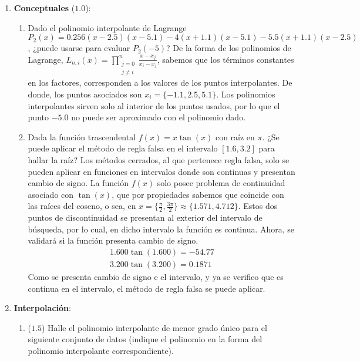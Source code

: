 \documentclass[12pt]{article}
\begin{document}
  \begin{enumerate}[leftmargin=*,widest=9]
    \item \textbf{Conceptuales} ($1.0$):
    \begin{enumerate}[label=\alph*]
    \item Dado el polinomio interpolante de Lagrange \(P_2(x) = 0.256(x-2.5)(x-5.1) - 4(x+1.1)(x-5.1) - 5.5(x+1.1)(x-2.5) \), ¿puede usarse para evaluar \(P_2(-5)\)?
    De la forma de los polinomios de Lagrange, \( L_{n, i}(x) = \prod\limits_{\substack{j = 0\\ j \neq i}}^n \frac{x- x_j}{x_i - x_j}\), sabemos que los términos constantes en los factores, corresponden a los valores de los puntos interpolantes. De donde, los puntos asociados son \(x_i = \lbrace -1.1, 2.5, 5.1 \rbrace \). Los polinomios interpolantes sirven solo al interior de los puntos usados, por lo que el punto \(-5.0\) no puede ser aproximado con el polinomio dado.
    \item Dada la función trascendental \(f(x) = x\tan(x) \) con raíz en \(\pi \). ¿Se puede aplicar el método de regla falsa en el intervalo \( \left[1.6, 3.2\right] \) para hallar la raíz?
    Los métodos cerrados, al que pertenece regla falsa, solo se pueden aplicar en funciones en intervalos donde son continuas y presentan cambio de signo. La función \(f(x)\) solo posee problema de continuidad asociado con \(\tan(x)\), que por propiedades sabemos que coincide con las raíces del coseno, o sea, en \(x = \lbrace \frac{\pi}{2}, \frac{3\pi}{2} \rbrace \approx \lbrace 1.571, 4.712 \rbrace \). Estos dos puntos de discontinuidad se presentan al exterior del intervalo de búsqueda, por lo cual, en dicho intervalo la función es continua.
    Ahora, se validará si la función presenta cambio de signo.
    \begin{eqnarray*}
    1.600 \tan(1.600) = -54.77 \\
    3.200 \tan(3.200) = 0.1871
    \end{eqnarray*}
    Como se presenta cambio de signo e el intervalo, y ya se verifico que es continua en el intervalo, el método de regla falsa se puede aplicar.
    \end{enumerate}
    \item \textbf{Interpolación}:
    \begin{enumerate}[label=\alph*]
    \item ($1.5$) Halle el polinomio interpolante de menor grado único para el siguiente conjunto de datos (indique el polinomio en la forma del polinomio interpolante correspondiente).

\end{enumerate}
\end{enumerate}
\end{document}
